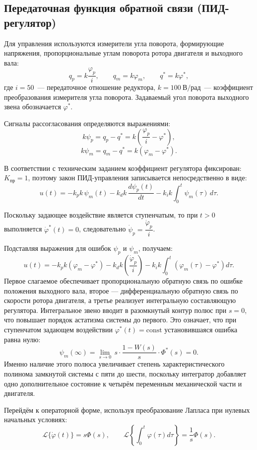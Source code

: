 \documentclass[a4paper, 14pt]{extarticle}
\begin{document}
\subsection{Передаточная функция обратной связи (ПИД-регулятор)}

Для управления используются измерители угла поворота, формирующие напряжения, пропорциональные углам поворота ротора двигателя и выходного вала:
\[
    q_p = k\frac{\varphi_p}{i}, \qquad
    q_m = k\varphi_m, \qquad
    q^* = k\varphi^*,
\]
где $i = 50$~--- передаточное отношение редуктора,
$k = 100\ \text{В/рад}$~--- коэффициент преобразования измерителя угла поворота.
Задаваемый угол поворота выходного звена обозначается $\varphi^*$.

Сигналы рассогласования определяются выражениями:
\[
    k\psi_p = q_p - q^* =
    k\left(\frac{\varphi_p}{i}-\varphi^*\right),
\]
\[
    k\psi_m = q_m - q^* =
    k\left(\varphi_m-\varphi^*\right).
\]

В соответствии с техническим заданием коэффициент регулятора
фиксирован: $K_{\text{пр}}=1$, поэтому закон ПИД-управления
записывается непосредственно в виде:
\[
    u(t)= -k_p k\,\psi_m(t)
    -k_d k\,\frac{d\psi_p(t)}{dt}
    -k_i k\int_0^t \psi_m(\tau)\,d\tau.
    \tag{1.7}
\]

Поскольку задающее воздействие является ступенчатым,
то при \(t>0\) выполняется $\dot{\varphi}^*(t)=0$,
следовательно $\dot{\psi}_p = \dfrac{\dot{\varphi}_p}{i}$.

Подставляя выражения для ошибок \(\psi_p\) и \(\psi_m\), получаем:
\[
    u(t)=
    -k_p k\left(\varphi_m-\varphi^*\right)
    -k_d k\left(
    \frac{\dot{\varphi}_p}{i}
    \right)
    -k_i k\int_0^t
    \left(
    \varphi_m(\tau)-\varphi^*
    \right)d\tau.
\]
Первое слагаемое обеспечивает пропорциональную обратную связь по ошибке положения выходного вала, второе — дифференциальную обратную связь по скорости ротора двигателя, а третье реализует интегральную составляющую регулятора. Интегральное звено вводит в разомкнутый контур полюс при $s=0$,
что повышает порядок астатизма системы до первого.
Это означает, что при ступенчатом задающем воздействии
$\varphi^*(t)=\text{const}$ установившаяся ошибка равна нулю:
\[
    \psi_m(\infty)=\lim_{s\to 0}\,s\cdot\frac{1-W(s)}{s}\cdot\Phi^*(s)=0.
\]
Именно наличие этого полюса увеличивает степень характеристического
полинома замкнутой системы с пяти до шести, поскольку интегратор
добавляет одно дополнительное состояние к четырём переменным
механической части и двигателя.

Перейдём к операторной форме, используя преобразование Лапласа при нулевых начальных условиях:
\[
    \mathcal{L}\{\dot{\varphi}(t)\}=s\Phi(s),
    \qquad
    \mathcal{L}
    \left\{
    \int_0^t \varphi(\tau)d\tau
    \right\}
    =
    \frac{1}{s}\Phi(s).
\]
\end{document}
